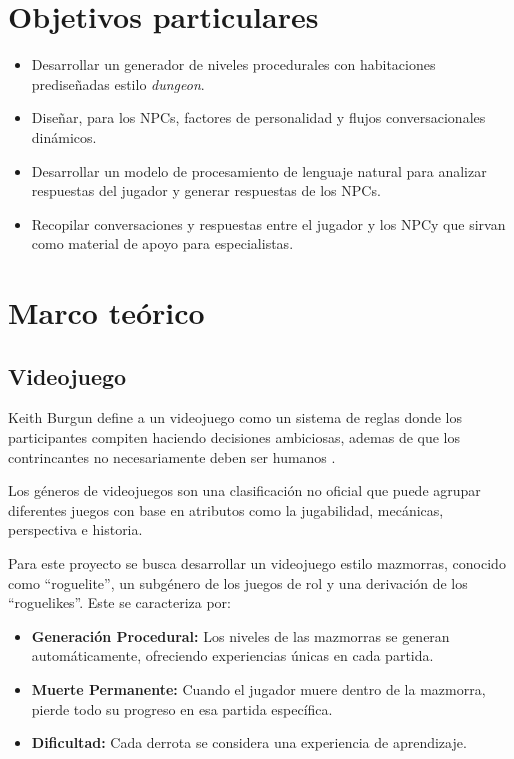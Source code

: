\documentclass[12pt,twoside]{article}
\begin{document}
	\section{Objetivos particulares}
	
	\begin{itemize}[noitemsep]
		\item Desarrollar un generador de niveles procedurales con habitaciones prediseñadas estilo \textit{dungeon}.
		\item Diseñar, para los NPCs, factores de personalidad y flujos conversacionales dinámicos.
		\item Desarrollar  un modelo  de procesamiento de lenguaje natural para analizar respuestas del jugador y generar respuestas de los NPCs.
		\item Recopilar conversaciones y respuestas entre el jugador y los NPCy que sirvan como material de apoyo para especialistas.
	\end{itemize}
	
	\clearpage
	
	\section{Marco teórico}
	
	\subsection{Videojuego}
	
	Keith Burgun define a un videojuego como un sistema de reglas donde los participantes compiten haciendo decisiones ambiciosas, ademas de que los contrincantes no necesariamente deben ser humanos \cite{info: videojuego1}.
	
	Los géneros  de videojuegos son una clasificación no oficial que puede agrupar diferentes juegos con base en atributos como la jugabilidad, mecánicas, perspectiva e historia. 
	
	Para este proyecto se busca desarrollar un videojuego estilo mazmorras, conocido como ``roguelite'', un subgénero de los juegos de rol y una derivación de los ``roguelikes''. Este se caracteriza por: 
	\begin{itemize}[noitemsep]
		\item \textbf{Generación Procedural:} Los niveles de las mazmorras se generan automáticamente, ofreciendo experiencias únicas en cada partida.
		\item \textbf{Muerte Permanente:} Cuando el jugador muere dentro de la mazmorra, pierde todo su progreso en esa partida específica.
		\item \textbf{Dificultad:} Cada derrota se considera una experiencia de aprendizaje.
	\end{itemize}
	
\end{document}
